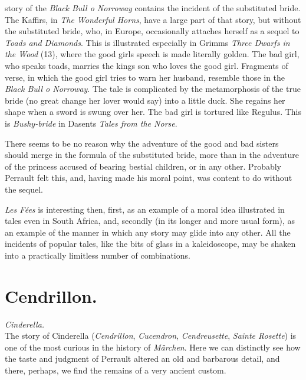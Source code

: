 \documentclass[14pt,a4paper]{memoir}
\newcommand{\notesection}[1]{%
  \addtonotes{\protect\par\protect\vspace{2ex}\protect\noindent\textbf{#1}\protect\par\protect\vspace{1ex}}%
}
\begin{document}
{story of the \emph{Black Bull o\textquotesingle{} Norroway} contains the
incident of the substituted bride. The Kaffirs, in \emph{The Wonderful
Horns}, have a large part of that story, but without the substituted
bride, who, in Europe, occasionally attaches herself as a sequel to
\emph{Toads and Diamonds}. This is illustrated especially in
Grimm\textquotesingle s \emph{Three Dwarfs in the Wood} (13), where the
good girl\textquotesingle s speech is made literally golden. The bad
girl, who speaks toads, marries the king\textquotesingle s son who loves
the good girl. Fragments of verse, in which the good girl tries to warn
her husband, resemble those in the \emph{Black Bull o\textquotesingle{}
Norroway}. The tale is complicated by the metamorphosis of the true
bride (no great change her lover would say) into \textquotesingle a
little duck.\textquotesingle{} She regains her shape when a sword is
swung over her. The bad girl is tortured like Regulus. This is
\emph{Bushy-bride} in Dasent\textquotesingle s \emph{Tales from the
Norse}.

There seems to be no reason why the adventure of the good and bad
sisters should merge in the formula of the substituted bride, more than
in the adventure of the princess accused of bearing bestial children, or
in any other. Probably Perrault felt this, and, having made his moral
point, was content to do without the sequel.

\emph{Les Fées} is interesting then, first, as an example of a moral
idea illustrated in tales even in South Africa, and, secondly (in its
longer and more usual form), as an example of the manner in which any
story may glide into any other. All the incidents of popular tales, like
the bits of glass in a kaleidoscope, may be shaken into a practically
limitless number of combinations.

\section{Cendrillon.}
\notesection{Cendrillon.}



\emph{Cinderella.} \\

The story of Cinderella (\emph{Cendrillon}, \emph{Cucendron},
\emph{Cendreusette}, \emph{Sainte Rosette}) is one of the most curious
in the history of \emph{Märchen}. Here we can distinctly see how the
taste and judgment of Perrault altered an old and barbarous detail, and
there, perhaps, we find the remains of a very ancient custom.

}
\end{document}
